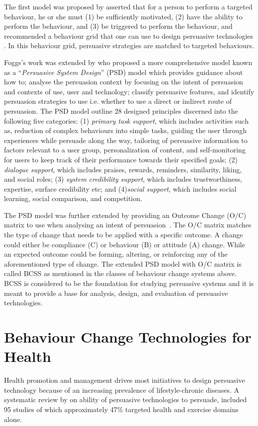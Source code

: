 The first model was proposed by \cite{fogg2009behavior} asserted that for a person to perform a targeted behaviour, he or she must (1) be sufficiently motivated, (2) have the ability to perform the behaviour, and (3) be triggered to perform the behaviour, and recommended a behaviour grid that one can use to design persuasive technologies \cite{fogg2009behavior2}. In this behaviour grid, persuasive strategies are matched  to targeted behaviours. 

Foggs's work was extended by \cite{Oinas-kukkonen:psd} who proposed a more comprehensive model known as a ``\emph{Persuasive System Design}'' (PSD) model which provides guidance about how to; analyse the persuasion context by focusing on the intent of persuasion and contexts of use, user and technology; classify persuasive features, and identify persuasion strategies to use i.e. whether to use a direct or indirect route of persuasion. The PSD model outline 28 designed principles discerned into the following five categories: (1) \emph{primary task support}, which includes activities such as, reduction of complex behaviours into simple tasks, guiding the user through experiences while persuade along the way, tailoring of persuasive information to factors relevant to a user group, personalization of content, and self-monitoring for users to keep track of their performance towards their specified goals; (2) \emph{dialogue support}, which includes praises, rewards, reminders, similarity, liking, and social roles; (3) \emph{system credibility support}, which includes trustworthiness, expertise, surface credibility etc; and (4)\emph{social support}, which includes social learning, social comparison, and competition.

The PSD model was further extended by providing an Outcome Change (O/C) matrix to use when analysing an intent of persuasion~\citep{Oinas-Kukkonen:foundation}. The O/C matrix matches the type of change that needs to be applied with a specific outcome. A change could either be compliance (C) or behaviour (B) or attitude (A) change. While an expected outcome could be forming, altering, or reinforcing any of the aforementioned type of change. The extended PSD model with O/C matrix is called BCSS as mentioned in the classes of behaviour change systems above. BCSS is considered to be the foundation for studying persuasive systems and it is meant to provide a base for analysis, design, and evaluation of persuasive technologies.   

\section{Behaviour Change Technologies for Health}
Health promotion and management drives most initiatives to design persuasive technology because of an increasing prevalence of lifestyle-chronic diseases. A systematic review by \cite{hamari2014persuasive} on ability of persuasive technologies to persuade, included 95 studies of which approximately 47\% targeted health and exercise domains alone.

